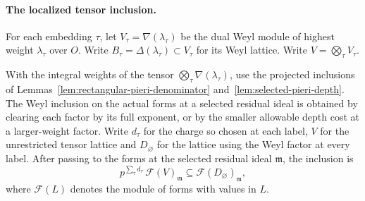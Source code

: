 \paragraph{The localized tensor inclusion.}
For each embedding \(\tau\), let \(V_\tau=\nabla(\lambda_\tau)\)
be the dual Weyl module of highest weight \(\lambda_\tau\) over \(O\).
Write \(B_\tau=\Delta(\lambda_\tau)\subset V_\tau\) for its Weyl lattice.
Write \(V=\bigotimes_\tau V_\tau\).



\begin{lemma}
\label{lem:localized-projected-weyl-values}
With the integral weights of the tensor \(\bigotimes_\tau
\nabla(\lambda_\tau)\), use the projected inclusions of
Lemmas~\ref{lem:rectangular-pieri-denominator}
and~\ref{lem:selected-pieri-depth}. The Weyl inclusion on the actual forms at
a selected residual ideal is obtained by clearing each factor
by its full exponent, or by the smaller allowable depth cost
at a larger-weight factor. Write \(d_\tau\) for the charge so chosen at each label, \(V\) for the unrestricted tensor lattice and \(D_\varnothing\) for the lattice using the Weyl factor at every label. After passing to the forms at the selected residual ideal \(\mathfrak m\), the inclusion is
\[
 p^{\sum_\tau d_\tau}\,\mathcal F(V)_{\mathfrak m}
 \subseteq \mathcal F(D_\varnothing)_{\mathfrak m},
\]
where \(\mathcal F(L)\) denotes the module of forms with values in \(L\).
\end{lemma}

